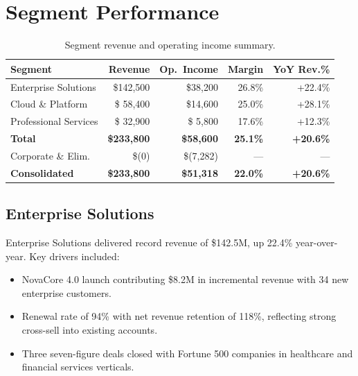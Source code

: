 \documentclass[
    language=english,
    doctype=financial-report,
    institution=none,
]{../../omnilatex}
\begin{document}
\section{Segment Performance}

\begin{table}[h]
    \centering
    \begin{tabular}{lrrrr}
        \toprule
        \textbf{Segment} & \textbf{Revenue} & \textbf{Op.\ Income} & \textbf{Margin} & \textbf{YoY Rev.\%} \\
        \midrule
        Enterprise Solutions  & \$142,500 & \$38,200 & 26.8\% & +22.4\% \\
        Cloud \& Platform     & \$ 58,400 & \$14,600 & 25.0\% & +28.1\% \\
        Professional Services & \$ 32,900 & \$ 5,800 & 17.6\% & +12.3\% \\
        \midrule
        \textbf{Total}        & \textbf{\$233,800} & \textbf{\$58,600} & \textbf{25.1\%} & \textbf{+20.6\%} \\
        \midrule
        Corporate \& Elim.    & \$(\phantom{0}0) & \$(7,282) & --- & --- \\
        \midrule
        \textbf{Consolidated} & \textbf{\$233,800} & \textbf{\$51,318} & \textbf{22.0\%} & \textbf{+20.6\%} \\
        \bottomrule
    \end{tabular}
    \caption{Segment revenue and operating income summary.}
\end{table}

\subsection{Enterprise Solutions}

Enterprise Solutions delivered record revenue of \$142.5M, up 22.4\%
year-over-year. Key drivers included:

\begin{itemize}
    \item NovaCore 4.0 launch contributing \$8.2M in incremental revenue
          with 34 new enterprise customers.
    \item Renewal rate of 94\% with net revenue retention of 118\%,
          reflecting strong cross-sell into existing accounts.
    \item Three seven-figure deals closed with Fortune 500 companies in
          healthcare and financial services verticals.
\end{itemize}
\end{document}
